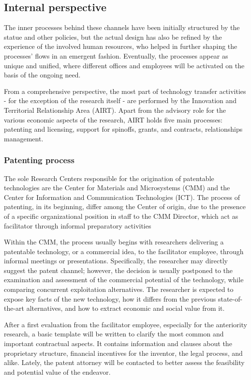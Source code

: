 \subsection{Internal perspective}

The inner processes behind these channels have been initially structured by the statue and other policies, but the actual design has also be refined by the experience of the involved human resources, who helped in further shaping the processes' flows in an emergent fashion. Eventually, the processes appear as unique and unified, where different offices and employees will be activated on the basis of the ongoing need. 

From a comprehensive perspective, the most part of technology transfer activities - for the exception of the research itself - are performed by the Innovation and Territorial Relationship Area (AIRT). Apart from the advisory role for the various economic aspects of the research, AIRT holds five main processes: patenting and licensing, support for spinoffs, grants, and contracts, relationships management.

\subsubsection{Patenting process}

The sole Research Centers responsible for the origination of patentable technologies are the Center for Materials and Microsystems (CMM) and the Center for Information and Communication Technologies (ICT). The process of patenting, in its beginning, differ among the Center of origin, due to the presence of a specific organizational position in staff to the CMM Director, which act as facilitator through informal preparatory activities

Within the CMM, the process usually begins with researchers delivering a patentable technology, or a commercial idea, to the facilitator employee, through informal meetings or presentations. Specifically, the researcher may directly suggest the patent channel; however, the decision is usually postponed to the examination and assessment of the commercial potential of the technology, while comparing concurrent exploitation alternatives. The researcher is expected to expose key facts of the new technology, how it differs from the previous state-of-the-art alternatives, and how to extract economic and social value from it. 

After a first evaluation from the facilitator employee, especially for the anteriority research, a basic template will be written to clarify the most common and important contractual aspects. It contains information and clauses about the proprietary structure, financial incentives for the inventor, the legal process, and alike. Lately, the patent attorney will be contacted to better assess the feasibility and potential value of the endeavor. 

